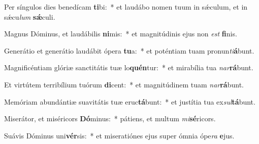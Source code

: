 \item Per síngulos dies benedícam \textbf{ti}bi:~* et laudábo nomen tuum in sǽculum, et in sǽcu\textit{lum} \textbf{sǽ}culi.
\item Magnus Dóminus, et laudábilis \textbf{ni}mis:~* et magnitúdinis ejus non \textit{est} \textbf{fi}nis.
\item Generátio et generátio laudábit ópera \textbf{tu}a:~* et poténtiam tuam pronun\textit{ti}\textbf{á}bunt.
\item Magnificéntiam glóriæ sanctitátis tuæ lo\textbf{quén}tur:~* et mirabília tua \textit{nar}\textbf{rá}bunt.
\item Et virtútem terribílium tuórum \textbf{di}cent:~* et magnitúdinem tuam \textit{nar}\textbf{rá}bunt.
\item Memóriam abundántiæ suavitátis tuæ eruc\textbf{tá}bunt:~* et justítia tua ex\textit{sul}\textbf{tá}bunt.
\item Miserátor, et miséricors \textbf{Dó}minus:~* pátiens, et multum \textit{mi}\textbf{sé}ricors.
\item Suávis Dóminus uni\textbf{vér}sis:~* et miseratiónes ejus super ómnia ópe\textit{ra} \textbf{e}jus.
